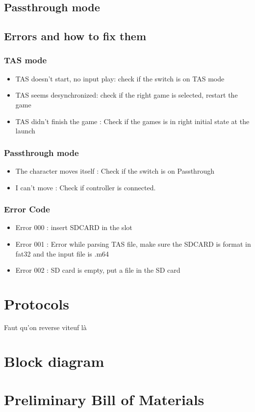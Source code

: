 \documentclass[a4paper,oneside,12pt]{article}
\begin{document}
\subsection{Passthrough mode}

\subsection{Errors and how to fix them}
\subsubsection{TAS mode}
\begin{itemize}
\item TAS doesn't start, no input play: check if the switch is on TAS mode
\item TAS seems desynchronized: check if the right game is selected, restart 
the game
\item TAS didn't finish the game : Check if the games is in right initial state 
at the launch
\end{itemize}

\subsubsection{Passthrough mode}
\begin{itemize}
\item The character moves itself : Check if the switch is on Passthrough
\item I can't move : Check if controller is connected.
\end{itemize}

\subsubsection{Error Code}
\begin{itemize}
\item Error 000 : insert SDCARD in the slot
\item Error 001 : Error while parsing TAS file, make sure the SDCARD is format 
in fat32 and the input file is .m64
\item Error 002 : SD card is empty, put a file in the SD card
\end{itemize}

\section{Protocols}
Faut qu'on reverse viteuf là

\section{Block diagram}

\section{Preliminary Bill of Materials}
\end{document}
